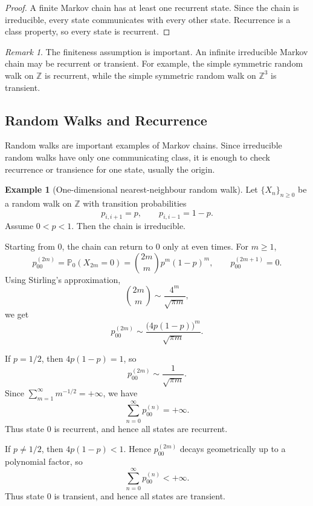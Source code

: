 \documentclass[11pt]{article}
\theoremstyle{plain}
\theoremstyle{definition}
\newtheorem{example}[theorem]{Example}
\theoremstyle{remark}
\newtheorem{remark}[theorem]{Remark}
\begin{document}
\begin{proof}
	A finite Markov chain has at least one recurrent state. Since the chain is irreducible, every state communicates with every other state. Recurrence is a class property, so every state is recurrent.
\end{proof}

\begin{remark}
	The finiteness assumption is important. An infinite irreducible Markov chain may be recurrent or transient. For example, the simple symmetric random walk on \(\mathbb{Z}\) is recurrent, while the simple symmetric random walk on \(\mathbb{Z}^3\) is transient.
\end{remark}



\subsection{Random Walks and Recurrence}

Random walks are important examples of Markov chains. Since irreducible random walks have only one communicating class, it is enough to check recurrence or transience for one state, usually the origin.

\begin{example}[One-dimensional nearest-neighbour random walk]
	Let \(\{X_n\}_{n\ge 0}\) be a random walk on \(\mathbb{Z}\) with transition probabilities
	\[
	p_{i,i+1}=p,
	\qquad
	p_{i,i-1}=1-p.
	\]
	Assume \(0<p<1\). Then the chain is irreducible.
	
	Starting from \(0\), the chain can return to \(0\) only at even times. For \(m\ge 1\),
	\[
	p_{00}^{(2m)}
	=
	\mathbb{P}_0(X_{2m}=0)
	=
	\binom{2m}{m}p^m(1-p)^m,
	\qquad
	p_{00}^{(2m+1)}=0.
	\]
	Using Stirling's approximation,
	\[
	\binom{2m}{m}
	\sim
	\frac{4^m}{\sqrt{\pi m}},
	\]
	we get
	\[
	p_{00}^{(2m)}
	\sim
	\frac{\bigl(4p(1-p)\bigr)^m}{\sqrt{\pi m}}.
	\]
	
	If \(p=1/2\), then \(4p(1-p)=1\), so
	\[
	p_{00}^{(2m)}
	\sim
	\frac{1}{\sqrt{\pi m}}.
	\]
	Since \(\sum_{m=1}^{\infty}m^{-1/2}=+\infty\), we have
	\[
	\sum_{n=0}^{\infty}p_{00}^{(n)}=+\infty.
	\]
	Thus state \(0\) is recurrent, and hence all states are recurrent.
	
	If \(p\neq 1/2\), then \(4p(1-p)<1\). Hence \(p_{00}^{(2m)}\) decays geometrically up to a polynomial factor, so
	\[
	\sum_{n=0}^{\infty}p_{00}^{(n)}<+\infty.
	\]
	Thus state \(0\) is transient, and hence all states are transient.
\end{example}
\end{document}
